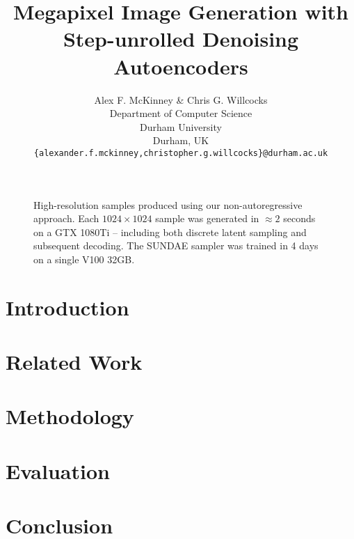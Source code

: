 \documentclass{article} %
\title{Megapixel Image Generation with Step-unrolled Denoising Autoencoders}
\author{Alex F. McKinney \& Chris G. Willcocks \\
Department of Computer Science\\
Durham University\\
Durham, UK \\
\texttt{\{alexander.f.mckinney,christopher.g.willcocks\}@durham.ac.uk} \\
}
\begin{document}
\maketitle

\begin{abstract}
    
\end{abstract}

\begin{figure}[ht]
    \centering
    \caption{
        High-resolution samples produced using our non-autoregressive approach.
        Each $1024 \times 1024$ sample was generated in $\approx 2$ seconds on a
        GTX 1080Ti -- including both discrete latent sampling and subsequent
        decoding. The SUNDAE sampler was trained in 4 days on a single V100
        32GB.
    }
\end{figure}

\section{Introduction}\label{sec:intro}


\section{Related Work}\label{sec:related}


\section{Methodology}\label{sec:method}


\section{Evaluation}\label{sec:evaluation}


\section{Conclusion}\label{sec:conclusion}


\pagebreak

{\small }
\end{document}

